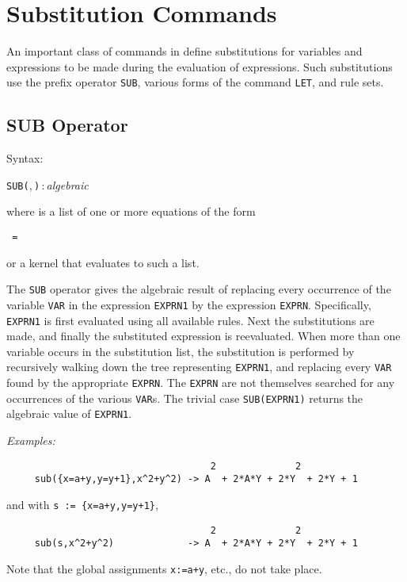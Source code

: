 \chapter{Substitution Commands}

\label{chapter:subst}

An important class of commands in {\REDUCE} define
substitutions for variables and expressions to be made during the
evaluation of expressions.  Such substitutions use the prefix operator
\texttt{SUB}, various forms of the command \texttt{LET}, and rule sets.

\section{SUB Operator}
\hypertarget{operator:SUB}{}

Syntax:
\begin{syntax}
  \texttt{SUB(},\,\texttt{)}\,:\,\textit{algebraic}
\end{syntax}
where  is a list of one or more equations of the
form
\begin{syntax}
  \texttt{ = }
\end{syntax}
or a kernel that evaluates to such a list.

The \texttt{SUB} operator gives the algebraic result of replacing every
occurrence of the variable \texttt{VAR} in the expression \texttt{EXPRN1} by the
expression \texttt{EXPRN}.  Specifically, \texttt{EXPRN1} is first evaluated
using all available rules.  Next the substitutions are made, and finally
the substituted expression is reevaluated.  When more than one variable
occurs in the substitution list, the substitution is performed by
recursively walking down the tree representing \texttt{EXPRN1}, and replacing
every \texttt{VAR} found by the appropriate \texttt{EXPRN}.  The \texttt{EXPRN} are
not themselves searched for any occurrences of the various \texttt{VAR}s.
The trivial case \texttt{SUB(EXPRN1)} returns the algebraic value of
\texttt{EXPRN1}.

\textit{Examples:}
\begin{verbatim}
                                    2              2
     sub({x=a+y,y=y+1},x^2+y^2) -> A  + 2*A*Y + 2*Y  + 2*Y + 1
\end{verbatim}
and with \texttt{s := \{x=a+y,y=y+1\}},
\begin{verbatim}
                                    2              2
     sub(s,x^2+y^2)             -> A  + 2*A*Y + 2*Y  + 2*Y + 1
\end{verbatim}
Note that the global assignments \texttt{x:=a+y}, etc., do not take place.

